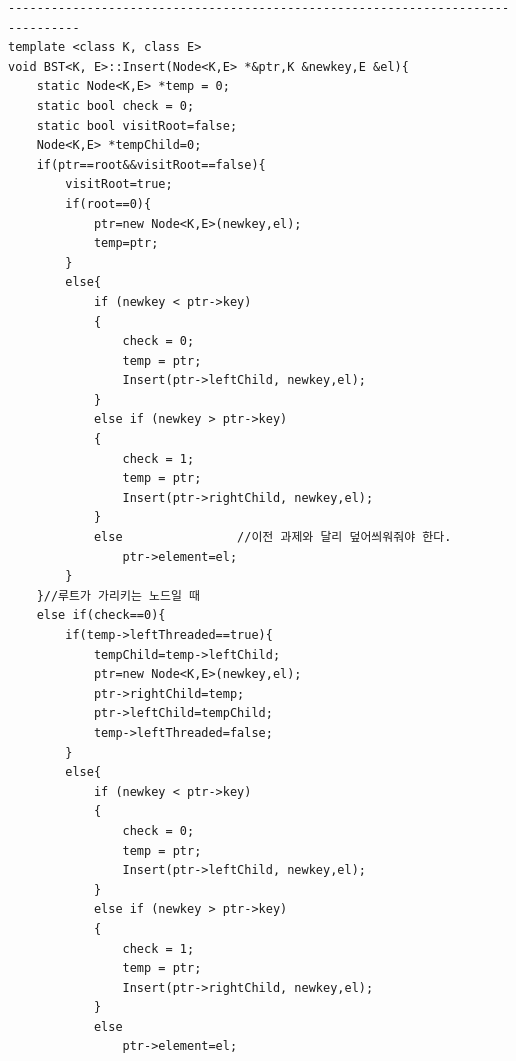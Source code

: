 \documentclass[a4paper,11pt]{article}
\begin{document}
\begin{Verbatim}
--------------------------------------------------------------------------------
template <class K, class E>
void BST<K, E>::Insert(Node<K,E> *&ptr,K &newkey,E &el){
    static Node<K,E> *temp = 0;
    static bool check = 0;
    static bool visitRoot=false;
    Node<K,E> *tempChild=0;
    if(ptr==root&&visitRoot==false){
        visitRoot=true;
        if(root==0){
            ptr=new Node<K,E>(newkey,el);
            temp=ptr;
        }
        else{
            if (newkey < ptr->key)
            {
                check = 0;
                temp = ptr;
                Insert(ptr->leftChild, newkey,el);
            }
            else if (newkey > ptr->key)
            {
                check = 1;
                temp = ptr;
                Insert(ptr->rightChild, newkey,el);
            }
            else				//이전 과제와 달리 덮어씌워줘야 한다.
                ptr->element=el;
        }
    }//루트가 가리키는 노드일 때 
    else if(check==0){
        if(temp->leftThreaded==true){
            tempChild=temp->leftChild;
            ptr=new Node<K,E>(newkey,el);
            ptr->rightChild=temp;
            ptr->leftChild=tempChild;
            temp->leftThreaded=false;
        }
        else{
            if (newkey < ptr->key)
            {
                check = 0;
                temp = ptr;
                Insert(ptr->leftChild, newkey,el);
            }
            else if (newkey > ptr->key)
            {
                check = 1;
                temp = ptr;
                Insert(ptr->rightChild, newkey,el);
            }
            else					
                ptr->element=el;


\end{Verbatim}
\end{document}
